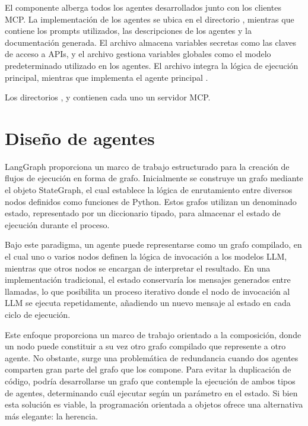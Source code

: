 El componente  alberga todos los agentes desarrollados junto con los clientes MCP. La implementación de los agentes se ubica en el directorio , mientras que  contiene los prompts utilizados, las descripciones de los agentes y la documentación generada. El archivo  almacena variables secretas como las claves de acceso a APIs, y el archivo  gestiona variables globales como el modelo predeterminado utilizado en los agentes. El archivo  integra la lógica de ejecución principal, mientras que  implementa el agente principal .

Los directorios ,  y  contienen cada uno un servidor MCP.
\section{Diseño de agentes}

LangGraph proporciona un marco de trabajo estructurado para la creación de flujos de ejecución en forma de grafo. Inicialmente se construye un grafo mediante el objeto StateGraph, el cual establece la lógica de enrutamiento entre diversos nodos definidos como funciones de Python. Estos grafos utilizan un denominado estado, representado por un diccionario tipado, para almacenar el estado de ejecución durante el proceso.

Bajo este paradigma, un agente puede representarse como un grafo compilado, en el cual uno o varios nodos definen la lógica de invocación a los modelos LLM, mientras que otros nodos se encargan de interpretar el resultado. En una implementación tradicional, el estado conservaría los mensajes generados entre llamadas, lo que posibilita un proceso iterativo donde el nodo de invocación al LLM se ejecuta repetidamente, añadiendo un nuevo mensaje al estado en cada ciclo de ejecución.

Este enfoque proporciona un marco de trabajo orientado a la composición, donde un nodo puede constituir a su vez otro grafo compilado que represente a otro agente. No obstante, surge una problemática de redundancia cuando dos agentes comparten gran parte del grafo que los compone. Para evitar la duplicación de código, podría desarrollarse un grafo que contemple la ejecución de ambos tipos de agentes, determinando cuál ejecutar según un parámetro en el estado. Si bien esta solución es viable, la programación orientada a objetos ofrece una alternativa más elegante: la herencia.

